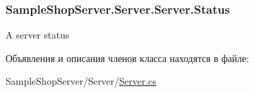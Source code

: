 \subsubsection[{Status}]{ Sample\+Shop\+Server.\+Server.\+Server.\+Status\hspace{0.3cm}{\ttfamily [get]}}\label{class_sample_shop_server_1_1_server_1_1_server_aa981a1322bbc9aa773a9aa46346e385d}


A server status 



Объявления и описания членов класса находятся в файле\+:\begin{DoxyCompactItemize}
\item 
Sample\+Shop\+Server/\+Server/\hyperlink{_server_8cs}{Server.\+cs}\end{DoxyCompactItemize}
